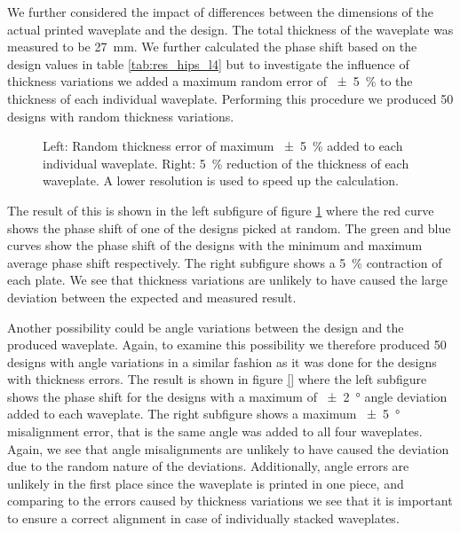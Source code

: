 We further considered the impact of differences between the dimensions of the actual printed waveplate and the design. The total thickness of the waveplate was measured to be \SI{27}{\milli \meter}. We further calculated the phase shift based on the design values in table \ref{tab:res_hips_l4} but to investigate the influence of thickness variations we added a maximum random error of \SI{\pm 5}{\percent} to the thickness of each individual waveplate. Performing this procedure we produced 50 designs with random thickness variations. 

\begin{figure}[H]
    \centering
    
    \caption{Left: Random thickness error of maximum \SI{\pm 5}{\percent} added to each individual waveplate. Right: \SI{5}{\percent} reduction of the thickness of each waveplate. A lower resolution is used to speed up the calculation.}
    \label{fig:delta_width_err}
\end{figure}

The result of this is shown in the left subfigure of figure \ref{fig:delta_width_err} where the red curve shows the phase shift of one of the designs picked at random. The green and blue curves show the phase shift of the designs with the minimum and  maximum  average  phase shift respectively. The right subfigure shows a \SI{5}{\percent} contraction of each plate. We see that thickness variations are unlikely to have caused the large deviation between the expected and measured result.

Another possibility could be angle variations between the design and the produced waveplate. Again, to examine this possibility we therefore produced 50 designs with angle variations in a similar fashion as it was done for the designs with thickness errors. The result is shown in figure \ref{} where the left subfigure shows the phase shift for the designs with a maximum of \SI{\pm2}{\degree} angle deviation added to each waveplate. The right subfigure shows a maximum \SI{\pm5}{\degree} misalignment error, that is the same angle was added to all four waveplates. Again, we see that angle misalignments are unlikely to have caused the deviation due to the random nature of the deviations. Additionally, angle errors are unlikely in the first place since the waveplate is printed in one piece, and comparing to the errors caused by thickness variations we see that it is important to ensure a correct alignment in case of individually stacked waveplates. 

